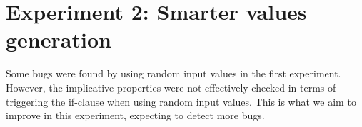 \chapter{Experiment 2: Smarter values generation}
\label{cpt:experiment2}
Some bugs were found by using random input values in the first experiment.
However, the implicative properties were not effectively checked in terms of
triggering the if-clause when using random input values. This is what we aim to
improve in this experiment, expecting to detect more bugs.


